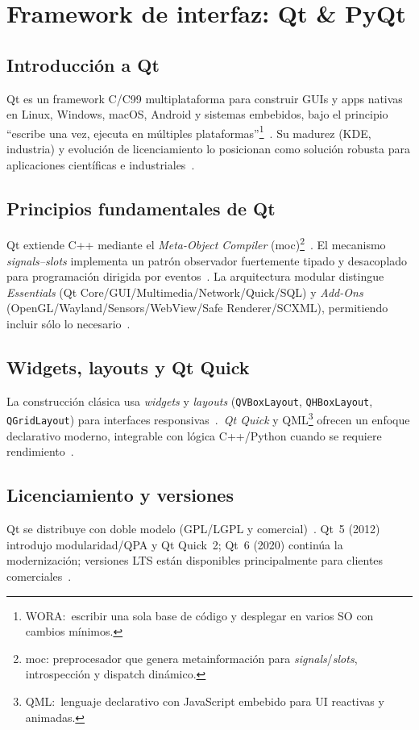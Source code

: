 \section[FrameworkQt \& PyQt]{Framework de interfaz: Qt \& PyQt}

\subsection{Introducción a Qt}
Qt es un framework C/C99 multiplataforma para construir GUIs y apps nativas en Linux, Windows, macOS, Android y sistemas embebidos, bajo el principio “escribe una vez, ejecuta en múltiples plataformas”\footnote{WORA:\ escribir una sola base de código y desplegar en varios SO con cambios mínimos.}~\cite{qt_wiki, qt_framework, lemberg, businesscloud, qt_history}. Su madurez (KDE, industria) y evolución de licenciamiento lo posicionan como solución robusta para aplicaciones científicas e industriales~\cite{qt_framework, qt_history}.

\subsection{Principios fundamentales de Qt}
Qt extiende C++ mediante el \emph{Meta-Object Compiler} (moc)\footnote{moc: preprocesador que genera metainformación para \emph{signals}/\emph{slots}, introspección y dispatch dinámico.}~\cite{qt_wiki}. El mecanismo \emph{signals–slots} implementa un patrón observador fuertemente tipado y desacoplado para programación dirigida por eventos~\cite{qt_mit_signals}. La arquitectura modular distingue \emph{Essentials} (Qt Core/GUI/Multimedia/Network/Quick/SQL) y \emph{Add-Ons} (OpenGL/Wayland/Sensors/WebView/Safe Renderer/SCXML), permitiendo incluir sólo lo necesario~\cite{qt_framework}.

\subsection{Widgets, layouts y Qt Quick}
La construcción clásica usa \emph{widgets} y \emph{layouts} (\texttt{QVBoxLayout}, \texttt{QHBoxLayout}, \texttt{QGridLayout}) para interfaces responsivas~\cite{businesscloud, tutorialspoint_pyqt}.\ \emph{Qt Quick} y QML\footnote{QML:\ lenguaje declarativo con JavaScript embebido para UI reactivas y animadas.} ofrecen un enfoque declarativo moderno, integrable con lógica C++/Python cuando se requiere rendimiento~\cite{qt_wiki, qt_for_python}.

\subsection{Licenciamiento y versiones}
Qt se distribuye con doble modelo (GPL/LGPL y comercial)~\cite{qt_wiki}. Qt~5 (2012) introdujo modularidad/QPA y Qt Quick~2; Qt~6 (2020) continúa la modernización; versiones LTS están disponibles principalmente para clientes comerciales~\cite{qt_framework, qt_history, qt_wiki, lemberg}.

